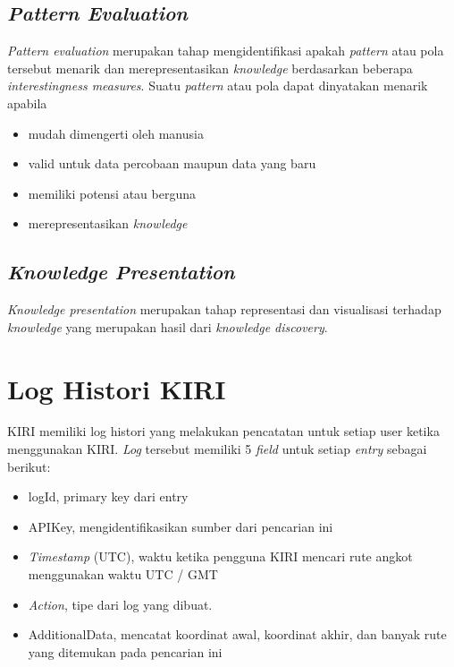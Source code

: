 \subsection{\textsl{Pattern Evaluation}}
\textsl{Pattern evaluation} merupakan tahap mengidentifikasi apakah \textsl{pattern} atau pola tersebut menarik dan merepresentasikan \textsl{knowledge} berdasarkan beberapa \textsl{interestingness measures}.
Suatu \textsl{pattern} atau pola dapat dinyatakan menarik apabila
\begin{itemize}
	\item mudah dimengerti oleh manusia
	\item valid untuk data percobaan maupun data yang baru
	\item memiliki potensi atau berguna
	\item merepresentasikan \textsl{knowledge}
\end{itemize}

\subsection{\textsl{Knowledge Presentation}}
\textsl{Knowledge presentation} merupakan tahap representasi dan visualisasi terhadap \textsl{knowledge} yang merupakan hasil dari \textsl{knowledge discovery}.	

\section{Log Histori KIRI}

KIRI memiliki log histori yang melakukan pencatatan untuk setiap user ketika menggunakan KIRI. \textsl{Log} tersebut memiliki 5 \textsl{field} untuk setiap \textsl{entry} sebagai berikut:
\begin{itemize}
	\item logId, primary key dari entry
	\item APIKey, mengidentifikasikan sumber dari pencarian ini
	\item \textsl{Timestamp} (UTC), waktu ketika pengguna KIRI mencari rute angkot menggunakan waktu UTC / GMT
	\item \textsl{Action}, tipe dari log yang dibuat.
	\item AdditionalData, mencatat koordinat awal, koordinat akhir, dan banyak rute yang ditemukan pada pencarian ini
\end{itemize}

